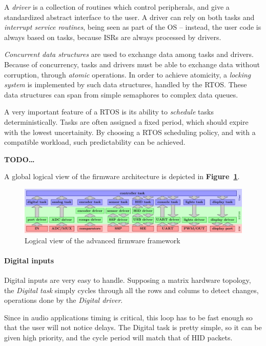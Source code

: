 \documentclass[a4paper,10pt]{article}
\newcommand{\TODO}{\textbf{TODO\dots\ }}
\newcommand{\citef}[1]{\textbf{Figure~\ref{#1}}}
\begin{document}
\begin{multicols}{2}
A \emph{driver} is a collection of routines which control peripherals, and
give a standardized abstract interface to the user. A driver can rely on both
tasks and \emph{interrupt service routines}, being seen as part of the OS
-- instead, the user code is always based on tasks, because ISRs are
always processed by drivers.

\emph{Concurrent data structures} are used to exchange data among tasks and
drivers. Because of concurrency, tasks and drivers must be able to exchange
data without corruption, through \emph{atomic} operations. In order to achieve
atomicity, a \emph{locking system} is implemented by such data structures,
handled by the RTOS. These data structures can span from simple semaphores
to complex data queues.

A very important feature of a RTOS is its ability to \emph{schedule} tasks
deterministically. Tasks are often assigned a fixed period, which should
expire with the lowest uncertainity. By choosing a RTOS scheduling policy,
and with a compatible workload, such predictability can be achieved.

\TODO

A global logical view of the firmware architecture is depicted in
\citef{fig:fw_adv}.

\begin{figure}[t]
	\centering
	\includegraphics[keepaspectratio=true,scale=0.4]{images/fw_adv.pdf}
	\caption{Logical view of the advanced firmware framework}
	\label{fig:fw_adv}
\end{figure}


\paragraph{Digital inputs}
Digital inputs are very easy to handle. Supposing a matrix hardware topology,
the \emph{Digital task} simply cycles through all the rows and colums to
detect changes, operations done by the \emph{Digital driver}.

Since in audio applications timing is critical, this loop has to be fast
enough so that the user will not notice delays. The Digital task is pretty
simple, so it can be given high priority, and the cycle period will match
that of HID packets.


\end{multicols}
\end{document}
